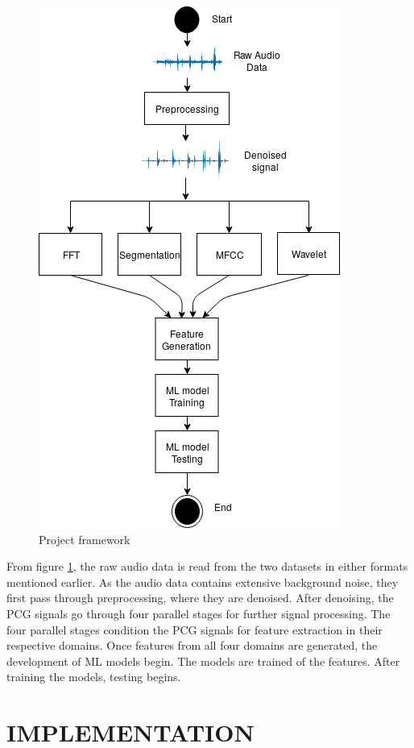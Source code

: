 \documentclass[10pt,twocolumn]{witseiepaper}
\begin{document}
\begin{figure}[h!]
    \centering
    \includegraphics[scale=0.6]{./framework2.png}
    \caption{Project framework}
    \label{fig:frame}
\end{figure}

From figure \ref{fig:frame}, the raw audio data is read from the two datasets in either formats mentioned earlier. As the audio data contains extensive background noise, they first pass through preprocessing, where they are denoised. After denoising, the PCG signals go through four parallel stages for further signal processing. The four parallel stages condition the PCG signals for feature extraction in their respective domains. Once features from all four domains are generated, the development of ML models begin. The models are trained of the features. After training the models, testing begins.

\section{IMPLEMENTATION}
\end{document}
